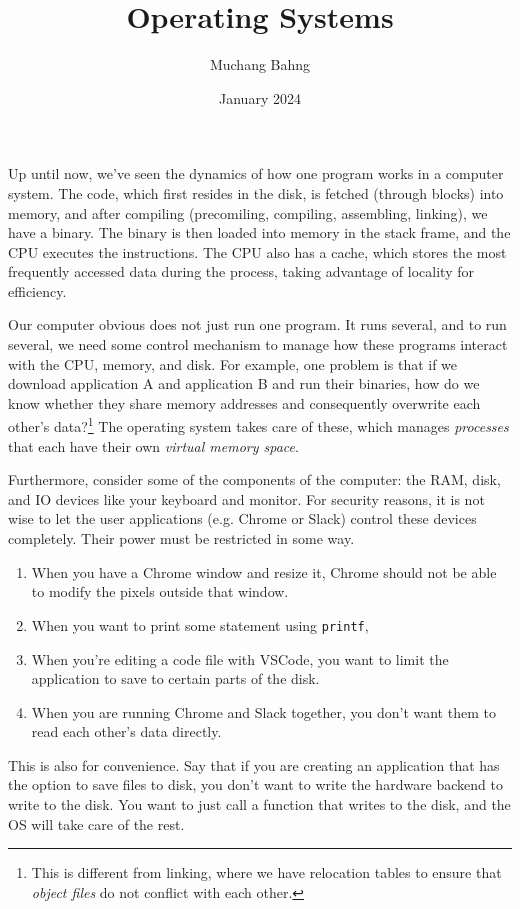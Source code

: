\documentclass{article}
\newcounter{example}[section]
\newcounter{code}[section]
\begin{document}
\title{Operating Systems}
\author{Muchang Bahng}
\date{January 2024}

\maketitle
\tableofcontents
\pagebreak

  Up until now, we've seen the dynamics of how one program works in a computer system. The code, which first resides in the disk, is fetched (through blocks) into memory, and after compiling (precomiling, compiling, assembling, linking), we have a binary. The binary is then loaded into memory in the stack frame, and the CPU executes the instructions. The CPU also has a cache, which stores the most frequently accessed data during the process, taking advantage of locality for efficiency. 

  Our computer obvious does not just run one program. It runs several, and to run several, we need some control mechanism to manage how these programs interact with the CPU, memory, and disk. For example, one problem is that if we download application A and application B and run their binaries, how do we know whether they share memory addresses and consequently overwrite each other's data?\footnote{This is different from linking, where we have relocation tables to ensure that \textit{object files} do not conflict with each other.} The operating system takes care of these, which manages \textit{processes} that each have their own \textit{virtual memory space}. 

  Furthermore, consider some of the components of the computer: the RAM, disk, and IO devices like your keyboard and monitor. For security reasons, it is not wise to let the user applications (e.g. Chrome or Slack) control these devices completely. Their power must be restricted in some way. 
  \begin{enumerate}
    \item When you have a Chrome window and resize it, Chrome should not be able to modify the pixels outside that window. 
    \item When you want to print some statement using \texttt{printf}, 
    \item When you're editing a code file with VSCode, you want to limit the application to save to certain parts of the disk. 
    \item When you are running Chrome and Slack together, you don't want them to read each other's data directly. 
  \end{enumerate}
  This is also for convenience. Say that if you are creating an application that has the option to save files to disk, you don't want to write the hardware backend to write to the disk. You want to just call a function that writes to the disk, and the OS will take care of the rest. 
\end{document}
